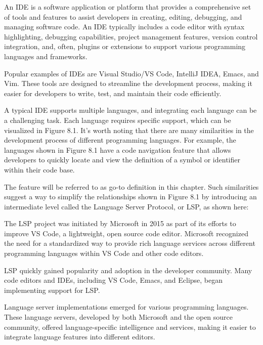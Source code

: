 An IDE is a software application or platform that provides a comprehensive set of tools and features to assist developers in creating, editing, debugging, and managing software code. An IDE typically includes a code editor with syntax highlighting, debugging capabilities, project management features, version control integration, and, often, plugins or extensions to support various programming languages and frameworks.

Popular examples of IDEs are Visual Studio/VS Code, IntelliJ IDEA, Emacs, and Vim. These tools are designed to streamline the development process, making it easier for developers to write, test, and maintain their code efficiently.

A typical IDE supports multiple languages, and integrating each language can be a challenging task. Each language requires specific support, which can be visualized in Figure 8.1. It’s worth noting that there are many similarities in the development process of different programming languages. For example, the languages shown in Figure 8.1 have a code navigation feature that allows developers to quickly locate and view the definition of a symbol or identifier within their code base.


The feature will be referred to as go-to definition in this chapter. Such similarities suggest a way to simplify the relationships shown in Figure 8.1 by introducing an intermediate level called the Language Server Protocol, or LSP, as shown here:


The LSP project was initiated by Microsoft in 2015 as part of its efforts to improve VS Code, a lightweight, open source code editor. Microsoft recognized the need for a standardized way to provide rich language services across different programming languages within VS Code and other code editors.

LSP quickly gained popularity and adoption in the developer community. Many code editors and IDEs, including VS Code, Emacs, and Eclipse, began implementing support for LSP.

Language server implementations emerged for various programming languages. These language servers, developed by both Microsoft and the open source community, offered language-specific intelligence and services, making it easier to integrate language features into different editors.


